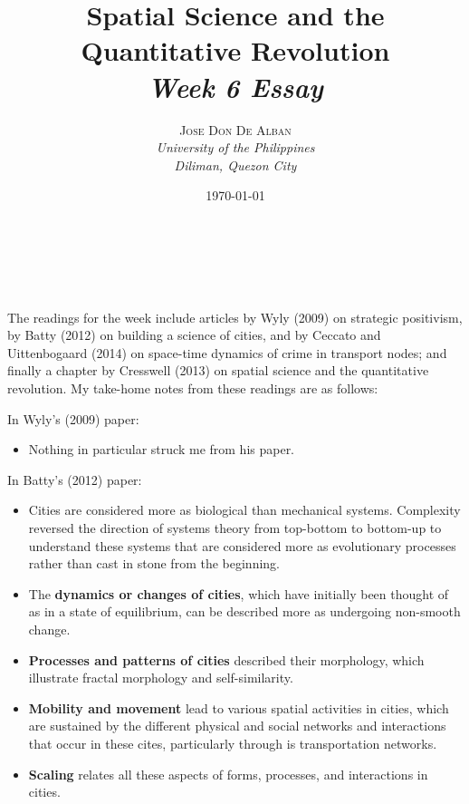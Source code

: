 \documentclass[a4paper, 10.5pt]{article} %
\title{\textbf{Spatial Science and the Quantitative Revolution}\\ %
\textsl{Week 6 Essay}} %
\author{\textsc{Jose Don De Alban} %
\\{\textit{University of the Philippines} %
\\{\textit{Diliman, Quezon City}}}} %
\date{\today} %
\makeatletter
\renewcommand{\maketitle}
{
\begin{flushright} %
{\LARGE\@title} %
\vspace{40pt} %

{\large\@author} %
\\\@date %

\vspace{10pt} %
\end{flushright}
}
\makeatother
\begin{document}
\maketitle %


\section*{}

The readings for the week include articles by Wyly (2009) \cite{wyly_2009} on strategic positivism, by Batty (2012) \cite{batty_2012} on building a science of cities, and by Ceccato and Uittenbogaard (2014) \cite{ceccato_uittenbogaard_2014} on space-time dynamics of crime in transport nodes; and finally a chapter by Cresswell (2013) \cite{cresswell_2013} on spatial science and the quantitative revolution. My take-home notes from these readings are as follows:

\vspace{10pt}

In Wyly's (2009) paper:

\begin{itemize}
  \item Nothing in particular struck me from his paper.
\end{itemize}

\vspace{10pt}

In Batty's (2012) paper:

\begin{itemize}
  \item Cities are considered more as biological than mechanical systems. Complexity reversed the direction of systems theory from top-bottom to bottom-up to understand these systems that are considered more as evolutionary processes rather than cast in stone from the beginning.
  \item The \textbf{dynamics or changes of cities}, which have initially been thought of as in a state of equilibrium, can be described more as undergoing non-smooth change.
  \item \textbf{Processes and patterns of cities} described their morphology, which illustrate fractal morphology and self-similarity.
  \item \textbf{Mobility and movement} lead to various spatial activities in cities, which are sustained by the different physical and social networks and interactions that occur in these cites, particularly through is transportation networks.
  \item \textbf{Scaling} relates all these aspects of forms, processes, and interactions in cities.
\end{itemize}
\end{document}

